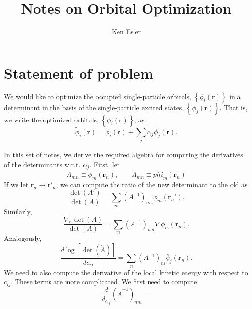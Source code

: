 \documentclass{article}
\title{Notes on Orbital Optimization}
\author{Ken Esler}
\begin{document}
\maketitle
\newcommand{\vr}{\mathbf{r}}
\newcommand{\Aopt}{\tilde{A}}
\section{Statement of problem}
We would like to optimize the occupied single-particle orbitals,
$\left\{\phi_i(\vr)\right\}$ in a determinant in the basis of the
single-particle excited states, $\left\{\bar{\phi}_j(\vr)\right\}$.
That is, we write the optimized orbitals,
$\left\{\tilde{\phi}_i(\vr)\right\}$, as
\begin{equation}
\tilde{\phi}_i(\vr) = \phi_i(\vr) + \sum_j c_{ij} \bar{\phi}_j(\vr).
\end{equation}

In this set of notes, we derive the required algebra for computing the
derivatives of the determinants w.r.t. $c_{ij}$.  First, let
\begin{equation}
A_{mn} \equiv \phi_m(\vr_n),\qquad \Aopt_{mn} \equiv \tilde{phi}_m(\vr_n)
\end{equation}
If we let $\vr_n \rightarrow \vr'_n$, we can compute the ratio of the
new determinant to the old as
\begin{equation}
\frac{\det(A')}{\det(A)} = \sum_m \left(A^{-1}\right)_{nm} \phi_m(\vr_n').
\end{equation}
Similarly,
\begin{equation}
\frac{\nabla_n\det(A)}{\det(A)} = \sum_m \left(A^{-1}\right)_{nm} \nabla\phi_m(\vr_n).
\end{equation}
Analogously, 
\begin{equation}
\frac{d\log\left[\det(\Aopt)\right]}{d c_{ij}} = \sum_n
\left(A^{-1}\right)_{ni} \bar{\phi}_j(\vr_n).
\end{equation}
We need to also compute the derivative of the local kinetic energy
with respect to $c_{ij}$.  These terms are more complicated.  We first
need to compute
\begin{equation}
\frac{d}{d_{c_{ij}}} \left(\Aopt^{-1}\right)_{nm} = 
\end{equation}
\end{document}
